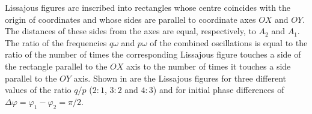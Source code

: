 Lissajous figures arc inscribed into rectangles whose centre coincides with the origin of coordinates and whose sides are parallel to coordinate axes $OX$ and $OY$. The distances of these sides from the axes are equal, respectively, to $A_{2}$ and $A_{1}$. The ratio of the frequencies $q\omega$ and $p\omega$ of the combined oscillations is equal to the ratio of the number of times the corresponding Lissajous figure touches a side of the rectangle parallel to the $OX$ axis to the number of times it touches a side parallel to the $OY$ axis. Shown in  are the Lissajous figures for three different values of the ratio $q/p$ ($2:1$, $3:2$ and $4:3$) and for initial phase differences of $\Delta \varphi = \varphi_{1} - \varphi_{2} = \pi/2$.



